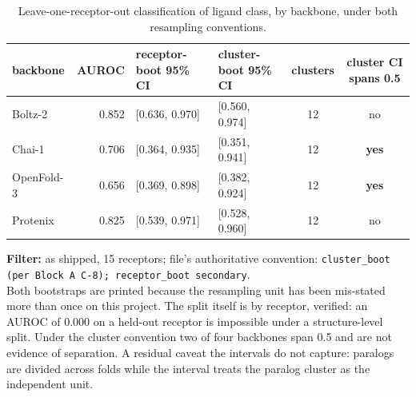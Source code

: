 \begin{table}[htbp]
\centering
\footnotesize
\caption{Leave-one-receptor-out classification of ligand class, by backbone, under both resampling conventions.}
\label{stab:classifier}
\begin{tabular}{lrllcc}
\toprule
backbone & AUROC & receptor-boot 95\% CI & cluster-boot 95\% CI & clusters & cluster CI spans 0.5 \\
\midrule
Boltz-2 & 0.852 & [0.636, 0.970] & [0.560, 0.974] & 12 & no \\
Chai-1 & 0.706 & [0.364, 0.935] & [0.351, 0.941] & 12 & \textbf{yes} \\
OpenFold-3 & 0.656 & [0.369, 0.898] & [0.382, 0.924] & 12 & \textbf{yes} \\
Protenix & 0.825 & [0.539, 0.971] & [0.528, 0.960] & 12 & no \\
\bottomrule
\end{tabular}
\begin{flushleft}\scriptsize
\textbf{Filter:} as shipped, 15 receptors; file's authoritative convention: \texttt{cluster\_boot (per Block A C-8); receptor\_boot secondary}. \\ Both bootstraps are printed because the resampling unit has been mis-stated more than once on this project. The split itself is by receptor, verified: an AUROC of 0.000 on a held-out receptor is impossible under a structure-level split. Under the cluster convention two of four backbones span 0.5 and are not evidence of separation. A residual caveat the intervals do not capture: paralogs are divided across folds while the interval treats the paralog cluster as the independent unit.
\end{flushleft}
\end{table}
